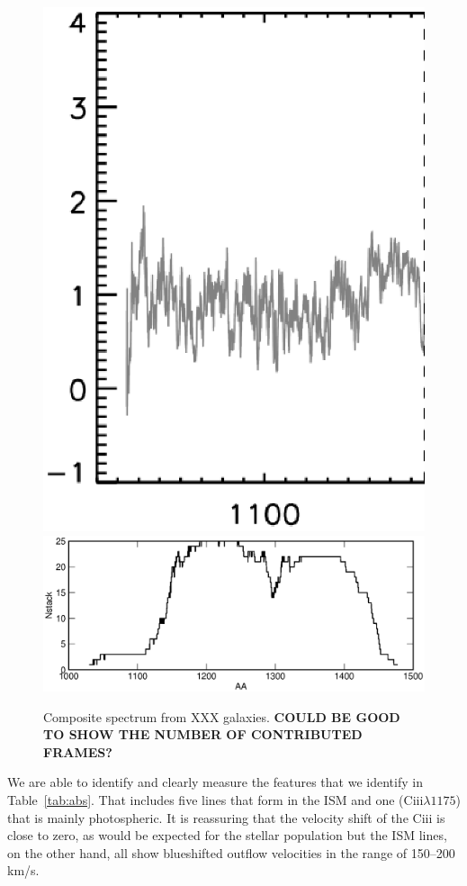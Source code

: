 \documentclass[manuscript]{emulateapj}
\begin{document}
\begin{figure}[t!]
   \centering
   \includegraphics[scale=.5]{stack.ps}
   \includegraphics[scale=.6]{Nstack.eps}
   \caption{Composite spectrum from XXX galaxies. {\bf COULD BE GOOD TO SHOW THE NUMBER OF CONTRIBUTED FRAMES?}}
   \label{fig:stack}
\end{figure}

We are able to identify and clearly measure the features that we identify in 
Table~\ref{tab:abs}. That includes five lines that form in the ISM
and one (C{\sc iii}$\lambda 1175$) that is mainly photospheric. It is 
reassuring that the velocity shift of the C{\sc iii} is close to zero, as
would be expected for the stellar population but the ISM lines, on the other
hand, all show blueshifted outflow velocities in the range of 150--200 km/s. 
\end{document}
